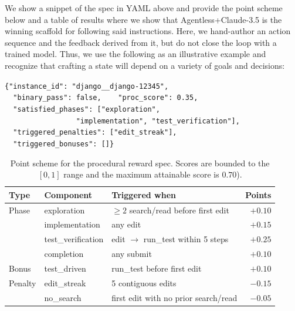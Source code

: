 \documentclass[11pt]{article}
\begin{document}
  We show a snippet of the spec in YAML above and provide the point scheme below and a table of results where we show that Agentless+Claude-3.5
  is the winning scaffold for following said instructions. Here, we hand-author an action sequence and the feedback derived from it, but do not
  close the loop with a trained model. Thus, we use the following as an illustrative example and recognize that crafting a state will depend on
  a variety of goals and decisions:

  \begin{tcolorbox}[colback=black!3, colframe=black!30, boxrule=0.4pt, left=10pt, right=10pt,
  top=8pt, bottom=8pt, fontupper=\small]
  \texttt{\{"instance\_id": "django\_\_django-12345",}\\
  \texttt{~~"binary\_pass": false,~~~~"proc\_score": 0.35,}\\
  \texttt{~~"satisfied\_phases": ["exploration",}\\
  \texttt{~~~~~~~~~~~~~~~~~"implementation", "test\_verification"],}\\
  \texttt{~~"triggered\_penalties": ["edit\_streak"],}\\
  \texttt{~~"triggered\_bonuses": []\}}
  \end{tcolorbox}

  \begin{table}[H]
  \centering\small
  \begin{tabular}{lllr}
  \toprule
  \textbf{Type} & \textbf{Component} & \textbf{Triggered when} & \textbf{Points} \\
  \midrule
  Phase   & exploration        & $\geq 2$ search/read before first edit & $+0.10$ \\
          & implementation     & any edit                               & $+0.15$ \\
          & test\_verification & edit $\to$ run\_test within 5 steps     & $+0.25$ \\
          & completion         & any submit                             & $+0.10$ \\
  \midrule
  Bonus   & test\_driven       & run\_test before first edit            & $+0.10$ \\
  \midrule
  Penalty & edit\_streak       & 5 contiguous edits                     & $-0.15$ \\
          & no\_search         & first edit with no prior search/read   & $-0.05$ \\
  \bottomrule
  \end{tabular}
  \caption{Point scheme for the procedural reward spec. Scores are bounded to the $[0,1]$ range and the maximum attainable score is $0.70$).}
  \label{tab:reward_scheme}
  \end{table}
\end{document}
